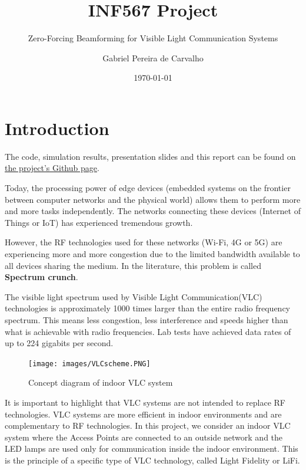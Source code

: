 \documentclass[a4paper,12pt,twoside]{article}
\title{INF567 Project}
\subtitle{Zero-Forcing Beamforming for Visible Light Communication Systems}
\author{Gabriel Pereira de Carvalho}
\date{\today}
\begin{document}
	
	\maketitle
	
	\tableofcontents
	
	\newpage
	
	\section{Introduction}
	
	\begin{tcolorbox}
		The code, simulation results, presentation slides and this report can be found on \href{https://github.com/ArkhamKnightGPC/INF567-Project}{the project's Github page}.
	\end{tcolorbox}
	
	Today, the processing power of edge devices (embedded systems on the frontier between computer networks and the physical world) allows them to perform more and more tasks independently. The networks connecting these devices (Internet of Things or IoT) has experienced tremendous growth.
	
	However, the RF technologies used for these networks (Wi-Fi, 4G or 5G) are experiencing more and more congestion due to the limited bandwidth available to all devices sharing the medium. In the literature, this problem is called \textbf{Spectrum crunch}.
	
	The visible light spectrum used by Visible Light Communication(VLC) technologies is approximately 1000 times larger than the entire radio frequency spectrum. This means less congestion, less interference and speeds higher than what is achievable with radio frequencies. Lab tests have achieved data rates of up to 224 gigabits per second\cite{LiFi}.
	
	\begin{figure}[h!]
		\centering
		\texttt{[image: images/VLCscheme.PNG]}
		\caption{Concept diagram of indoor VLC system \cite{Indonesia2017}}
	\end{figure}
	
	It is important to highlight that VLC systems are not intended to replace RF technologies. VLC systems are more efficient in indoor environments and are complementary to RF technologies. In this project, we consider an indoor VLC system where the Access Points are connected to an outside network and the LED lamps are used only for communication inside the indoor environment. This is the principle of a specific type of VLC technology, called Light Fidelity or LiFi.
	
\end{document}
